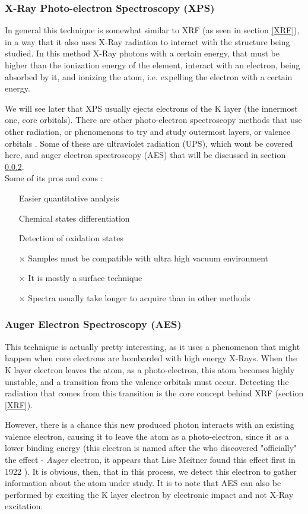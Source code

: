 \documentclass[]{article}
\begin{document}
\subsubsection{X-Ray Photo-electron Spectroscopy (XPS)} \label{XPS}
In general this technique is somewhat similar to XRF (as seen in section \ref{XRF}), in a way that it also uses X-Ray radiation to interact with the structure being studied. In this method X-Ray photons with a certain energy, that must be higher than the ionization energy of the element, interact with an electron, being absorbed by it, and ionizing the atom, i.e. expelling the electron with a certain energy.
\par We will see later that XPS usually ejects electrons of the K layer (the innermost one, core orbitals). There are other photo-electron spectroscopy methods that use other radiation, or phenomenons  to try and study outermost layers, or valence orbitals \cite{JMH_Modern}. Some of these are ultraviolet radiation (UPS), which wont be covered here, and auger electron spectroscopy (AES) that will be discussed in section \ref{AES}.\\

Some of its pros and cons \cite{CL_XPS}:
\begin{itemize}
\item[\checkmark] Easier quantitative analysis
\item[\checkmark] Chemical states differentiation
\item[\checkmark] Detection of oxidation states
\item[$\times$] Samples must be compatible with ultra high vacuum environment
\item[$\times$] It is mostly a surface technique
\item[$\times$] Spectra usually take longer to acquire than in other methods
\end{itemize}

\subsubsection{Auger Electron Spectroscopy (AES)} \label{AES}
This technique is actually pretty interesting, as it uses a phenomenon that might happen when core electrons are bombarded with high energy X-Rays. When the K layer electron leaves the atom, as a photo-electron, this atom becomes highly unstable, and a transition from the valence orbitals must occur. Detecting the radiation that comes from this transition is the core concept behind XRF (section \ref{XRF}). 
\par However, there is a chance this new produced photon interacts with an existing valence electron, causing it to leave the atom as a photo-electron, since it as a lower binding energy (this electron is named after the who discovered "officially" the effect - \textit{Auger} electron, it appears that Lise Meitner found this effect first in 1922 \cite{AU_Wiki}). It is obvious, then, that in this process, we detect this electron to gather information about the atom under study. It is to note that AES can also be performed by exciting the K layer electron by electronic impact and not X-Ray excitation.\\
\end{document}

